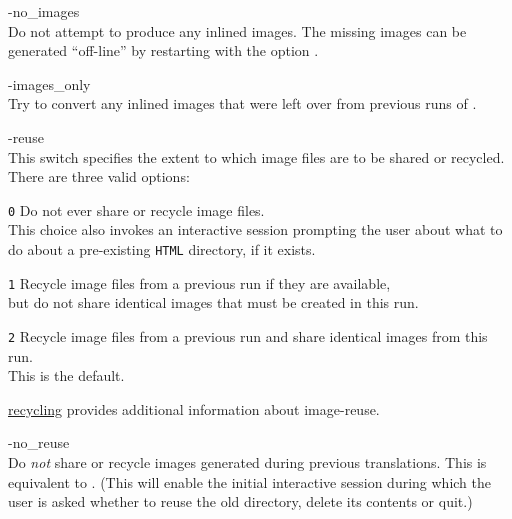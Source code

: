 \begin{htmllist}
%
\item [ -no\_images\label{cs_noimages}]
\\
Do not attempt to produce any inlined images. 
The missing images can be generated ``off-line'' by restarting \latextohtml{}
with the option .

%
\item [ -images\_only\label{cs_imagesonly}]
\\
Try to convert any inlined images that were left over from previous
runs of \latextohtml. 


%
\item [ -reuse \Meta{reuse\_option}\label{cs_reuseoptions}]
\\
This switch specifies the extent to which image files are to be shared
or recycled.\html{\\}
There are three valid options:
%
\begin{htmllist}
%
\item [\texttt{0}] 
Do not ever share or recycle image files.\\
This choice also invokes an interactive session 
prompting the user about what to do about
a pre-existing \texttt{HTML} directory, if it exists.
%
%
\item [\texttt{1}] 
Recycle image files from a previous run if they are available,\\
but do not share identical images that must be created in this run.
%
%
\item [\texttt{2}] 
Recycle image files from a previous run and share identical
images from this run.\\
This is the default.
\end{htmllist}
\hyperref{A later section}{Section~}{}{recycling} provides 
additional information about image-reuse.


%
\item [ -no\_reuse\label{cs_noreuse}]
\\
Do \emph{not} share or recycle images generated during previous translations.
This is equivalent to .
(This will enable the initial interactive session during which the user is
asked whether to reuse the old directory, delete its contents or quit.)%



\end{htmllist}

